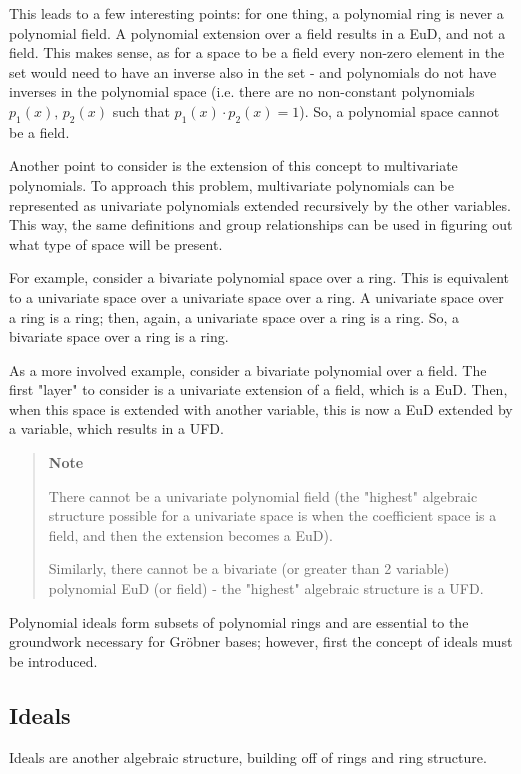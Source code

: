 \documentclass[letterpaper,12pt,titlepage,oneside,final]{book}
\newenvironment{note}{\begin{quote}%
  \textbf{Note }%
  \quad
}{%
\end{quote}%
}
\begin{document}
This leads to a few interesting points: for one thing, a polynomial ring is never a polynomial field.  A polynomial extension over a field results in a EuD, and not a field.  This makes sense, as for a space to be a field every non-zero element in the set would need to have an inverse also in the set - and polynomials do not have inverses in the polynomial space (i.e. there are no non-constant polynomials ${p_1(x),\, p_2(x)}$ such that ${p_1(x) \cdot p_2(x) = 1}$).  So, a polynomial space cannot be a field.

Another point to consider is the extension of this concept to multivariate polynomials.  To approach this problem, multivariate polynomials can be represented as univariate polynomials extended recursively by the other variables.  This way, the same definitions and group relationships can be used in figuring out what type of space will be present.  

For example, consider a bivariate polynomial space over a ring.  This is equivalent to a univariate space over a univariate space over a ring.  A univariate space over a ring is a ring; then, again, a univariate space over a ring is a ring.  So, a bivariate space over a ring is a ring.

As a more involved example, consider a bivariate polynomial over a field.  The first "layer" to consider is a univariate extension of a field, which is a EuD.  Then, when this space is extended with another variable, this is now a EuD extended by a variable, which results in a UFD.  

\begin{note}
  There cannot be a univariate polynomial field (the "highest" algebraic structure possible for a univariate space is when the coefficient space is a field, and then the extension becomes a EuD).
  
  Similarly, there cannot be a bivariate (or greater than 2 variable) polynomial EuD (or field) - the "highest" algebraic structure is a UFD. 
\end{note}      

Polynomial ideals form subsets of polynomial rings and are essential to the groundwork necessary for Gr\"obner bases; however, first the concept of ideals must be introduced.

\subsection{Ideals}

Ideals are another algebraic structure, building off of rings and ring structure.  
\end{document}

